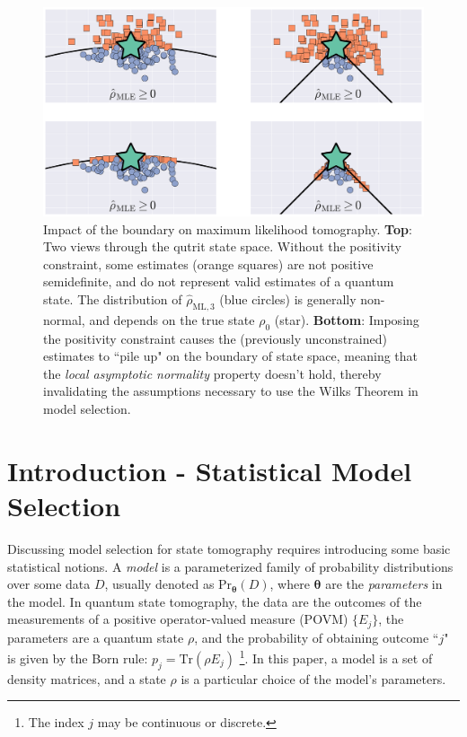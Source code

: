 \documentclass[aps,pra, twocolumn]{revtex4-1}
\newcommand{\bs}[1]{\boldsymbol{#1}}
\newcommand{\rhohat}{\hat{\rho}}
\newcommand{\rhoML}[1]{\rhohat_{\scriptscriptstyle{\mathrm{ML},#1}}}
\begin{document}
\begin{figure}[h]
\includegraphics[width=\columnwidth]{Images/Figure_1.pdf}
 \caption{Impact of the boundary on maximum likelihood tomography. \textbf{Top}: Two views through the qutrit state space. Without the positivity constraint, some estimates (orange squares) are not positive semidefinite, and do not represent valid estimates of a quantum state. The distribution of $\rhoML{3}$ (blue circles) is generally non-normal, and depends on the true state $\rho_{0}$ (star).
\textbf{Bottom}:  Imposing the positivity constraint causes the (previously unconstrained) estimates to ``pile up" on the boundary of state space, meaning that the \emph{local asymptotic normality} property doesn't hold, thereby invalidating the assumptions necessary to use the Wilks Theorem in model selection.}
\label{fig:boundaries}
\end{figure}

\section{Introduction - Statistical Model Selection}
\label{sec:intro}
Discussing model selection for state tomography requires introducing some basic statistical notions.  A \emph{model} is a parameterized family of probability distributions over some data $D$, usually denoted as $\mathrm{Pr}_{\bs{\theta}}(D)$, where $\bs{\theta}$ are the \emph{parameters} in the model. In quantum state tomography, the data are the outcomes of the measurements of a positive operator-valued measure (POVM) $\{E_{j}\}$, the parameters are a quantum state $\rho$, and the probability of obtaining outcome ``$j$" is given by the Born rule: $p_{j} = \mathrm{Tr}(\rho E_{j})$ \footnote{The index $j$ may be continuous or discrete.}. In this paper, a model is a set of density matrices, and a state $\rho$ is a particular choice of the model's parameters.
\end{document}
